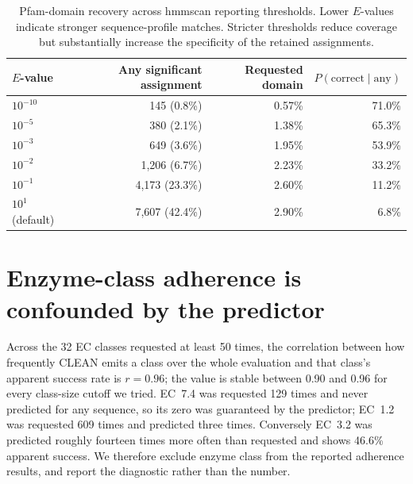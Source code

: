 \documentclass{article} %
\newcommand{\pct}{\%}
\begin{document}
\begin{table}[H]
\caption{Pfam-domain recovery across hmmscan reporting thresholds. 
Lower $E$-values indicate stronger
sequence-profile matches. Stricter thresholds reduce coverage but substantially
increase the specificity of the retained assignments.\\}
\label{tab:domain-thresholds}
\centering
\small
\begin{tabular}{lrrr}
\toprule
$E$-value & Any significant assignment & Requested domain
& $P(\text{correct}\mid\text{any})$ \\
\midrule
$10^{-10}$ & 145 \enspace(0.8\pct)      & 0.57\pct & 71.0\pct \\
$10^{-5}$  & 380 \enspace(2.1\pct)      & 1.38\pct & 65.3\pct \\
$10^{-3}$  & 649 \enspace(3.6\pct)      & 1.95\pct & 53.9\pct \\
$10^{-2}$  & 1{,}206 (6.7\pct)          & 2.23\pct & 33.2\pct \\
$10^{-1}$  & 4{,}173 (23.3\pct)         & 2.60\pct & 11.2\pct \\
$10^{1}$ (default) & 7{,}607 (42.4\pct) & 2.90\pct & 6.8\pct \\
\bottomrule
\end{tabular}
\end{table}

\section{Enzyme-class adherence is confounded by the predictor}\label{app:ec}
Across the 32 EC classes requested at least 50 times, the correlation between
how frequently CLEAN emits a class over the whole evaluation and that class's
apparent success rate is $r = 0.96$; the value is stable between 0.90 and 0.96
for every class-size cutoff we tried. EC~7.4 was requested 129 times and never
predicted for any sequence, so its zero was guaranteed by the predictor;
EC~1.2 was requested 609 times and predicted three times. Conversely EC~3.2 was
predicted roughly fourteen times more often than requested and shows 46.6\pct{}
apparent success. We therefore exclude enzyme class from the reported adherence results, and report the diagnostic rather than the number.
\end{document}
